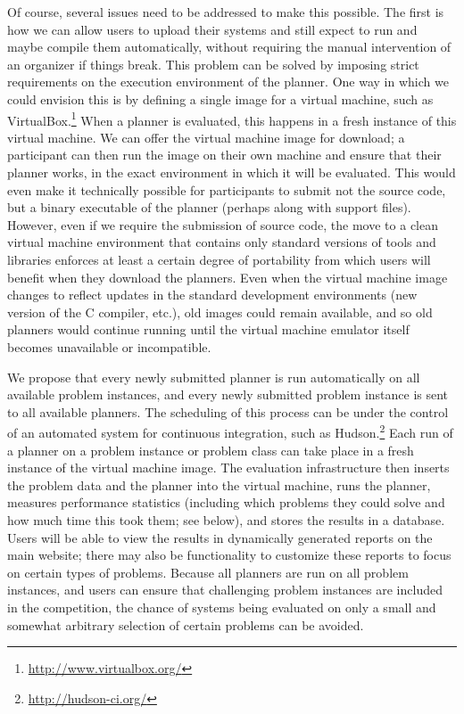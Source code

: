 Of course, several issues need to be addressed to make this possible.
The first is how we can allow users to upload their systems and still
expect to run and maybe compile them automatically, without requiring
the manual intervention of an organizer if things break.  This problem
can be solved by imposing strict requirements on the execution
environment of the planner.  One way in which we could envision this
is by defining a single image for a virtual machine, such as
VirtualBox.\footnote{\url{http://www.virtualbox.org/}} When a planner
is evaluated, this happens in a fresh instance of this virtual
machine.  We can offer the virtual machine image for download; a
participant can then run the image on their own machine and ensure
that their planner works, in the exact environment in which it will be
evaluated.  This would even make it technically possible for
participants to submit not the source code, but a binary executable of
the planner (perhaps along with support files).  However, even if we
require the submission of source code, the move to a clean virtual
machine environment that contains only standard versions of tools and
libraries enforces at least a certain degree of portability from which
users will benefit when they download the planners.  Even when the
virtual machine image changes to reflect updates in the standard
development environments (new version of the C compiler, etc.), old
images could remain available, and so old planners would continue
running until the virtual machine emulator itself becomes unavailable
or incompatible.

We propose that every newly submitted planner is run automatically on
all available problem instances, and every newly submitted problem
instance is sent to all available planners.  The scheduling of this
process can be under the control of an automated system for continuous
integration, such as Hudson.\footnote{\url{http://hudson-ci.org/}}
Each run of a planner on a problem instance or problem class can take
place in a fresh instance of the virtual machine image.  The
evaluation infrastructure then inserts the problem data and the
planner into the virtual machine, runs the planner, measures
performance statistics (including which problems they could solve and
how much time this took them; see below), and stores the results in a
database.  Users will be able to view the results in dynamically
generated reports on the main website; there may also be functionality to
customize these reports to focus on certain types of problems.  Because all
planners are run on all problem instances, and users can ensure that
challenging problem instances are included in the competition, the chance
of systems being evaluated on only a small and somewhat arbitrary selection
of certain problems \cite{pg2008002} can be avoided.

